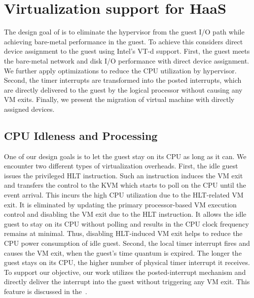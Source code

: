 \section{Virtualization support for HaaS}


The design goal of \na is to eliminate the hypervisor from
the guest I/O path while achieving bare-metal performance in
the guest. To achieve this \na considers direct device
assignment to the guest using Intel's VT-d support. First, the
guest meets the bare-metal network and disk I/O performance
with direct device assignment. We further apply optimizations
to reduce the CPU utilization by hypervisor. Second, the timer
interrupts are transformed into the posted interrupts, which
are directly delivered to the guest by the logical processor
without causing any VM exits. Finally, we present the
migration of virtual machine with directly assigned devices.

\subsection{CPU Idleness and Processing}
One of our design goals is to let the guest stay on its CPU as
long as it can. We encounter two different types of
virtualization overheads. First, the idle guest issues the
privileged HLT instruction. Such an instruction induces the VM
exit and transfers the control to the KVM which starts to poll
on the CPU until the event arrival. This incurs the high CPU
utilization due to the HLT-related VM exit. It is eliminated
by updating the primary processor-based VM execution control
and disabling the VM exit due to the HLT instruction. It
allows the idle guest to stay on its CPU without polling
and results in the CPU clock frequency remains at minimal.
Thus, disabling HLT-induced VM exit helps to reduce the CPU
power consumption of idle guest. Second, the local timer
interrupt fires and causes the VM exit, when the guest's time
quantum is expired. The longer the guest stays on its CPU, the
higher number of physical timer interrupt it receives. To
support our objective, our work utilizes the posted-interrupt
mechanism and directly deliver the interrupt into the guest
without triggering any VM exit. This feature is discussed in
the~.

